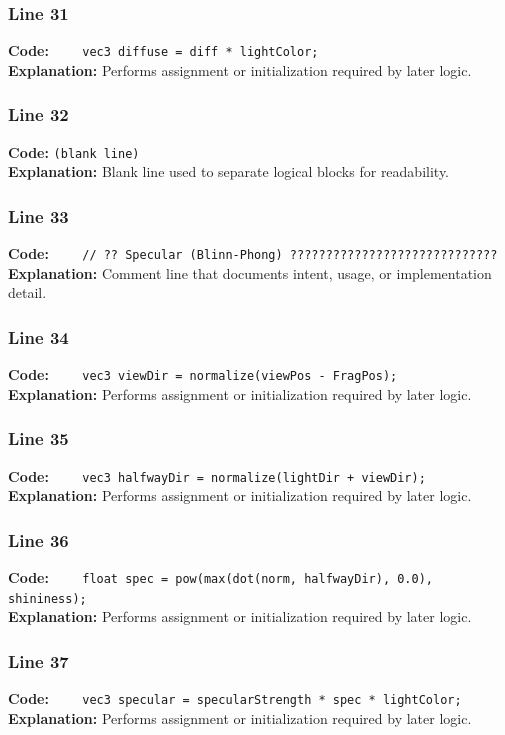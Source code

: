 \documentclass[11pt,a4paper]{article}
\begin{document}
\subsubsection*{Line 31}
\textbf{Code:} \verb|    vec3 diffuse = diff * lightColor;|\\
\textbf{Explanation:} Performs assignment or initialization required by later logic.

\subsubsection*{Line 32}
\textbf{Code:} \texttt{(blank line)}\\
\textbf{Explanation:} Blank line used to separate logical blocks for readability.

\subsubsection*{Line 33}
\textbf{Code:} \verb|    // ?? Specular (Blinn-Phong) ?????????????????????????????|\\
\textbf{Explanation:} Comment line that documents intent, usage, or implementation detail.

\subsubsection*{Line 34}
\textbf{Code:} \verb|    vec3 viewDir = normalize(viewPos - FragPos);|\\
\textbf{Explanation:} Performs assignment or initialization required by later logic.

\subsubsection*{Line 35}
\textbf{Code:} \verb|    vec3 halfwayDir = normalize(lightDir + viewDir);|\\
\textbf{Explanation:} Performs assignment or initialization required by later logic.

\subsubsection*{Line 36}
\textbf{Code:} \verb|    float spec = pow(max(dot(norm, halfwayDir), 0.0), shininess);|\\
\textbf{Explanation:} Performs assignment or initialization required by later logic.

\subsubsection*{Line 37}
\textbf{Code:} \verb|    vec3 specular = specularStrength * spec * lightColor;|\\
\textbf{Explanation:} Performs assignment or initialization required by later logic.
\end{document}
